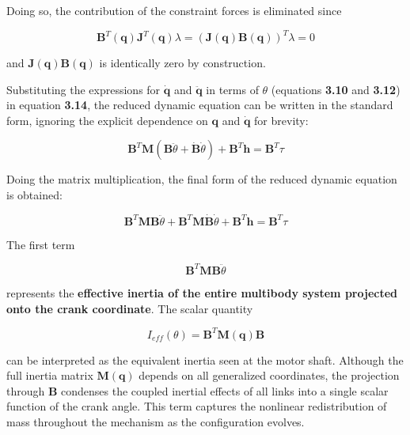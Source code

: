 Doing so, the contribution of the constraint forces is eliminated since 

\begin{equation}
\textbf{B}^T(\textbf{q})\textbf{J}^T(\textbf{q})\lambda =
(\textbf{J}(\textbf{q})\textbf{B}(\textbf{q}))^T\lambda = 0
\end{equation}

and $\textbf{J}(\textbf{q})\textbf{B}(\textbf{q})$ is identically zero by construction.

Substituting the expressions for $\dot{\textbf{q}}$ and $\ddot{\textbf{q}}$ in terms of $\theta$ (equations \textbf{3.10} and \textbf{3.12}) in equation \textbf{3.14}, the reduced dynamic equation can be written in the standard form, ignoring the explicit dependence on $\textbf{q}$ and $\dot{\textbf{q}}$ for brevity:

\begin{equation}
\textbf{B}^T\textbf{M}(\textbf{B}\ddot{\theta} + \dot{\textbf{B}}\dot{\theta}) + \textbf{B}^T\textbf{h} = \textbf{B}^T\tau
\end{equation}

Doing the matrix multiplication, the final form of the reduced dynamic equation is obtained:

\begin{equation}
\textbf{B}^T\textbf{M}\textbf{B}\ddot{\theta} + \textbf{B}^T\textbf{M}\dot{\textbf{B}}\dot{\theta} + \textbf{B}^T\textbf{h} = \textbf{B}^T\tau
\end{equation}

The first term

\begin{equation*}
    \textbf{B}^T\textbf{M}\textbf{B}\ddot{\theta}
\end{equation*}

represents the \textbf{effective inertia of the entire multibody system projected onto the crank coordinate}. The scalar quantity

\begin{equation}
I_{eff}(\theta) = \textbf{B}^T\textbf{M}(\textbf{q})\textbf{B}
\end{equation}

can be interpreted as the equivalent inertia seen at the motor shaft. Although the full inertia matrix $\textbf{M}(\textbf{q})$ depends on all generalized coordinates, the projection through $\textbf{B}$ condenses the coupled inertial effects of all links into a single scalar function of the crank angle. This term captures the nonlinear redistribution of mass throughout the mechanism as the configuration evolves.

